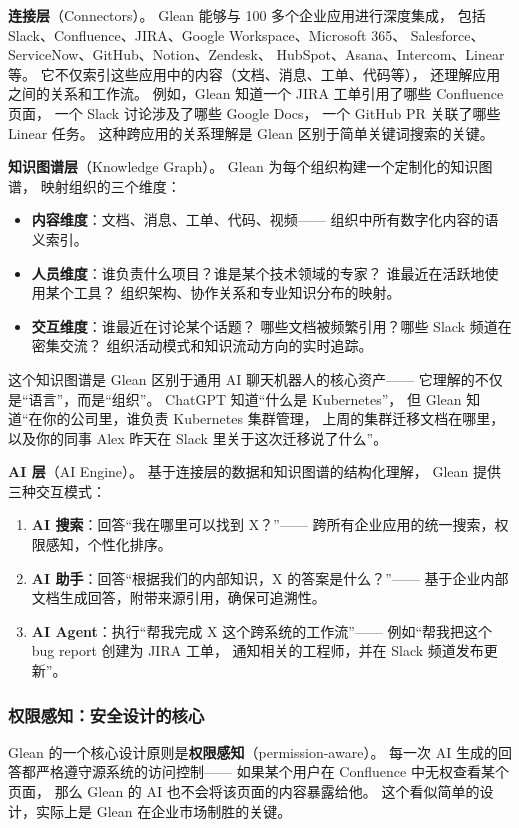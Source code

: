 \textbf{连接层}（Connectors）。
Glean 能够与 100 多个企业应用进行深度集成，
包括 Slack、Confluence、JIRA、Google Workspace、Microsoft 365、
Salesforce、ServiceNow、GitHub、Notion、Zendesk、
HubSpot、Asana、Intercom、Linear 等。
它不仅索引这些应用中的内容（文档、消息、工单、代码等），
还理解应用之间的关系和工作流。
例如，Glean 知道一个 JIRA 工单引用了哪些 Confluence 页面，
一个 Slack 讨论涉及了哪些 Google Docs，
一个 GitHub PR 关联了哪些 Linear 任务。
这种跨应用的关系理解是 Glean 区别于简单关键词搜索的关键。

\textbf{知识图谱层}（Knowledge Graph）。
Glean 为每个组织构建一个定制化的知识图谱，
映射组织的三个维度：

\begin{itemize}[noitemsep]
  \item \textbf{内容维度}：文档、消息、工单、代码、视频——
        组织中所有数字化内容的语义索引。
  \item \textbf{人员维度}：谁负责什么项目？谁是某个技术领域的专家？
        谁最近在活跃地使用某个工具？
        组织架构、协作关系和专业知识分布的映射。
  \item \textbf{交互维度}：谁最近在讨论某个话题？
        哪些文档被频繁引用？哪些 Slack 频道在密集交流？
        组织活动模式和知识流动方向的实时追踪。
\end{itemize}

这个知识图谱是 Glean 区别于通用 AI 聊天机器人的核心资产——
它理解的不仅是``语言''，而是``组织''。
ChatGPT 知道``什么是 Kubernetes''，
但 Glean 知道``在你的公司里，谁负责 Kubernetes 集群管理，
上周的集群迁移文档在哪里，
以及你的同事 Alex 昨天在 Slack 里关于这次迁移说了什么''。

\textbf{AI 层}（AI Engine）。
基于连接层的数据和知识图谱的结构化理解，
Glean 提供三种交互模式：

\begin{enumerate}[noitemsep]
  \item \textbf{AI 搜索}：回答``我在哪里可以找到 X？''——
        跨所有企业应用的统一搜索，权限感知，个性化排序。
  \item \textbf{AI 助手}：回答``根据我们的内部知识，X 的答案是什么？''——
        基于企业内部文档生成回答，附带来源引用，确保可追溯性。
  \item \textbf{AI Agent}：执行``帮我完成 X 这个跨系统的工作流''——
        例如``帮我把这个 bug report 创建为 JIRA 工单，
        通知相关的工程师，并在 Slack 频道发布更新''。
\end{enumerate}

\subsubsection{权限感知：安全设计的核心}
Glean 的一个核心设计原则是\textbf{权限感知}（permission-aware）。
每一次 AI 生成的回答都严格遵守源系统的访问控制——
如果某个用户在 Confluence 中无权查看某个页面，
那么 Glean 的 AI 也不会将该页面的内容暴露给他。
这个看似简单的设计，实际上是 Glean 在企业市场制胜的关键。

